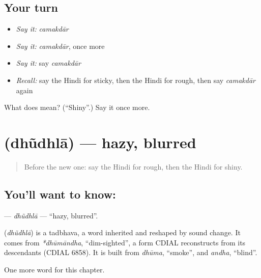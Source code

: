 \subsection*{Your turn}
\begin{itemize}
\raggedright
  \item \emph{Say it:} \emph{camakdār}
  \item \emph{Say it:} \emph{camakdār}, once more
  \item \emph{Say it:} say \emph{camakdār}
  \item \emph{Recall:} say the Hindi for sticky, then the Hindi for rough, then say \emph{camakdār} again
\end{itemize}

\begin{tcolorbox}[breakable,colback=teal!4,colframe=teal!35!black,title={Before you move on}]
What does  mean? (\textquotedblleft{}Shiny\textquotedblright{}.) Say it once more.
\end{tcolorbox}
\section[\texorpdfstring{\hi{धुंधला} (dhũdhlā)}{धुंधला (dhũdhlā)}]{ (dhũdhlā) — hazy, blurred}

\label{lesson:HI-C239-dhudhla}



\begin{quote}
Before the new one: say the Hindi for rough, then the Hindi for shiny.
\end{quote}

\subsection*{You'll want to know: }
\textbf{} — \emph{dhũdhlā} — \textquotedblleft{}hazy, blurred\textquotedblright{}.

\begin{cousinweb}
\textbf{} (\emph{dhũdhlā}) is a tadbhava, a word inherited and reshaped by sound change. It comes from \emph{*dhūmāndha}, \textquotedblleft{}dim-sighted\textquotedblright{}, a form CDIAL reconstructs from its descendants (CDIAL 6858). It is built from \emph{dhūma}, \textquotedblleft{}smoke\textquotedblright{}, and \emph{andha}, \textquotedblleft{}blind\textquotedblright{}.
\end{cousinweb}

\begin{grammarlens}[title={What you've built}]
One more word for this chapter.
\end{grammarlens}

